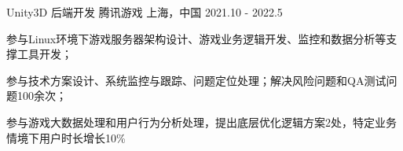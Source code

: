 

\begin{cventries}

  \cventry
    {Unity3D 后端开发} %
    {腾讯游戏} %
    {上海，中国} %
    {2021.10 - 2022.5} %
    {
      \begin{cvitems} %
        \item {参与Linux环境下游戏服务器架构设计、游戏业务逻辑开发、监控和数据分析等支撑工具开发；
}
        \item {参与技术方案设计、系统监控与跟踪、问题定位处理；解决风险问题和QA测试问题100余次；}
        \item {参与游戏大数据处理和用户行为分析处理，提出底层优化逻辑方案2处，特定业务情境下用户时长增长10\%}
      \end{cvitems}
    }


\end{cventries}
